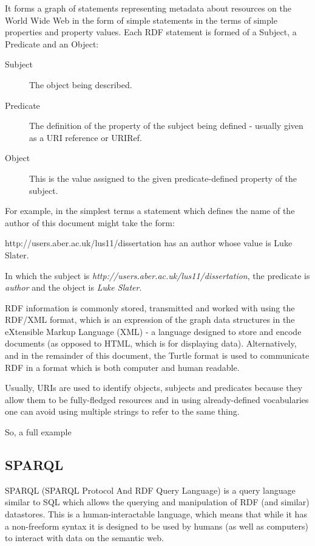\documentclass{article}
\begin{document}
It forms a graph of statements representing metadata about resources on the
World Wide Web in the form of simple statements in the terms of simple
properties and property values. Each RDF statement is formed of a Subject, a
Predicate and an Object:

\begin{description}
    \item[Subject] The object being described.
    \item[Predicate] The definition of the property of the subject being
    defined - usually given as a URI reference or URIRef.
    \item[Object] This is the value assigned to the given
    predicate-defined property of the subject.
\end{description}

For example, in the simplest terms a statement which defines the name of the author of
this document might take the form:

http://users.aber.ac.uk/lus11/dissertation has an author whose value is Luke
Slater.

In which the subject is \emph{http://users.aber.ac.uk/lus11/dissertation}, the
predicate is \emph{author} and the object is \emph{Luke Slater}.

RDF information is commonly stored, transmitted and worked with using the
RDF/XML format, which is an expression of the graph data structures in the
eXtensible Markup Language (XML) - a language designed to store and encode
documents (as opposed to HTML, which is for displaying data). Alternatively, and
in the remainder of this document, the Turtle format is used to communicate RDF
in a format which is both computer and human readable.

Usually, URIs are used to identify objects, subjects and predicates because they
allow them to be fully-fledged resources and in using already-defined
vocabularies one can avoid using multiple strings to refer to the same thing.

So, a full example

\subsection{SPARQL}

SPARQL (SPARQL Protocol And RDF Query Language) is a query language similar to
SQL which allows the querying and manipulation of RDF (and similar) datastores.
This is a human-interactable language, which means that while it has a
non-freeform syntax it is designed to be used by humans (as well as computers)
to interact with data on the semantic web.
\end{document}
